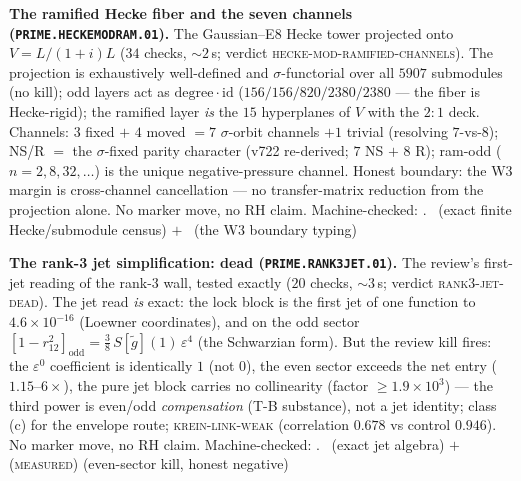 \par\smallskip\noindent\textbf{The ramified Hecke fiber and the
seven channels (\texttt{PRIME.HECKEMODRAM.01}).}
The Gaussian--E8 Hecke tower projected onto $V=L/(1+i)L$ ($34$
checks, ${\sim}2$\,s; verdict
\textsc{hecke-mod-ramified-channels}).  The projection is
exhaustively well-defined and $\sigma$-functorial over all $5907$
submodules (no kill); odd layers act as
$\mathrm{degree}\cdot\mathrm{id}$ ($156/156/820/2380/2380$ --- the
fiber is Hecke-rigid); the ramified layer \emph{is} the $15$
hyperplanes of $V$ with the $2{:}1$ deck.  Channels: $3$ fixed $+$
$4$ moved $=7$ $\sigma$-orbit channels $+1$ trivial (resolving
$7$-vs-$8$); NS/R $=$ the $\sigma$-fixed parity character (v722
re-derived; $7$ NS $+$ $8$ R); ram-odd ($n=2,8,32,\ldots$) is the
unique negative-pressure channel.  Honest boundary: the W3 margin
is cross-channel cancellation --- no transfer-matrix reduction from
the projection alone.  No marker move, no RH claim.
Machine-checked: .
\mE\ (exact finite Hecke/submodule census) $+$ \mC\ (the W3
boundary typing)
\par\smallskip


\par\smallskip\noindent\textbf{The rank-3 jet simplification: dead
(\texttt{PRIME.RANK3JET.01}).}
The review's first-jet reading of the rank-3 wall, tested exactly
($20$ checks, ${\sim}3$\,s; verdict \textsc{rank3-jet-dead}).  The
jet read \emph{is} exact: the lock block is the first jet of one
function to $4.6\times10^{-16}$ (Loewner coordinates), and on the
odd sector
$[1-r_{12}^2]_{\mathrm{odd}}=\tfrac38\,S[\tilde g](1)\,
\varepsilon^4$ (the Schwarzian form).  But the review kill fires:
the $\varepsilon^0$ coefficient is identically $1$ (not $0$), the
even sector exceeds the net entry ($1.15$--$6\times$), the pure jet
block carries no collinearity (factor $\ge1.9\times10^3$) --- the
third power is even/odd \emph{compensation} (T-B substance), not a
jet identity; class (c) for the envelope route;
\textsc{krein-link-weak} (correlation $0.678$ vs control $0.946$).
No marker move, no RH claim.
Machine-checked: .
\mE\ (exact jet algebra) $+$ (\textsc{measured}) (even-sector kill,
honest negative)
\par\smallskip


